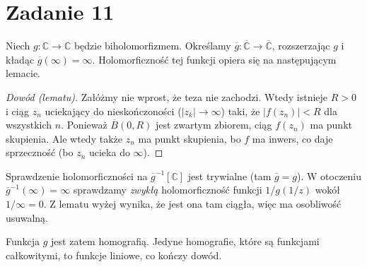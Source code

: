 \section*{Zadanie 11}

Niech \( g: \mathbb{C} \to \mathbb{C} \) będzie biholomorfizmem. Określamy \( \overline{g}: \overline{ \mathbb{C} } \to \overline{ \mathbb{C} } \), rozszerzając \( g \) i kładąc \( \overline{g}(\infty) = \infty \). Holomorficzność tej funkcji opiera się na następującym lemacie.


\begin{proof}[Dowód (lematu)]
    Załóżmy nie wprost, że teza nie zachodzi. Wtedy istnieje \( R > 0 \) i ciąg \( z_n \) uciekający do nieskończoności (\( \left| z_k \right| \to \infty  \)) taki, że \( \left| f(z_n) \right| < R \) dla wszystkich \( n \). Ponieważ \( \overline{B}(0, R) \) jest zwartym zbiorem, ciąg \( f(z_n) \) ma punkt skupienia. Ale wtedy także \( z_n \) ma punkt skupienia, bo \( f \) ma inwers, co daje sprzeczność (bo \( z_n \) ucieka do \( \infty \)).
\end{proof}

Sprawdzenie holomorficzności na \( \overline{g}^{-1}[ \mathbb{C} ] \) jest trywialne (tam \( \overline{g} = g \)). W otoczeniu \( \overline{g}^{-1}(\infty) = \infty \) sprawdzamy \textit{zwykłą} holomorficzność funkcji \( 1/g(1/z) \) wokół \( 1/\infty = 0 \). Z lematu wyżej wynika, że jest ona tam ciągła, więc ma osobliwość usuwalną.

Funkcja \( g \) jest zatem homografią. Jedyne homografie, które są funkcjami całkowitymi, to funkcje liniowe, co kończy dowód.

